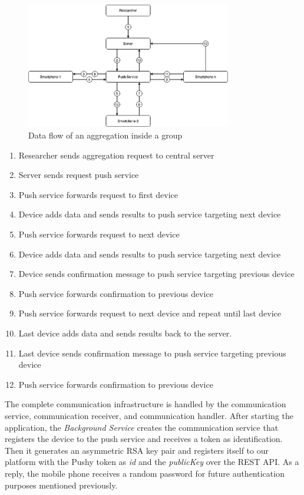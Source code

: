 \begin{figure}[htbp]
  \centering
  \includegraphics[width=0.8\textwidth]{figures/ar2}
  \caption{Data flow of an aggregation inside a group} \label{fig:ar2}
\end{figure}

\begin{enumerate}
	\item Researcher sends aggregation request to central server
	\item Server sends request push service
	\item Push service forwards request to first device
	\item Device adds data and sends results to push service targeting next device
	\item Push service forwards request to next device
	\item Device adds data and sends results to push service targeting next device
	\item Device sends confirmation message to push service targeting previous device
	\item Push service forwards confirmation to previous device
	\item Push service forwards request to next device and repeat until last device
	\item Last device adds data and sends results back to the server.
	\item Last device sends confirmation message to push service targeting previous device
	\item Push service forwards confirmation to previous device
\end{enumerate}

The complete communication infrastructure is handled by the communication service, communication receiver, and communication handler. After starting the application, the \textit{Background Service} creates the communication service that registers the device to the push service and receives a token as identification. Then it generates an asymmetric RSA key pair and registers itself to our platform with the Pushy token as \textit{id} and the \textit{publicKey} over the REST API. As a reply, the mobile phone receives a random password for future authentication purposes mentioned previously.

